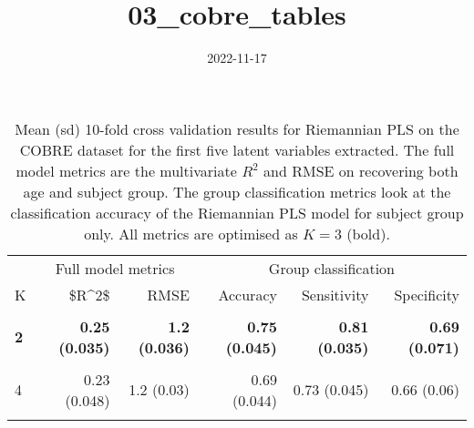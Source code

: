 \documentclass[
]{article}
\title{03\_cobre\_tables}
\author{}
\date{\vspace{-2.5em}2022-11-17}
\begin{document}
\maketitle

\begin{table}[htbp]

\caption{\label{tab:cobre_cv_results}Mean (sd) 10-fold cross validation results for Riemannian PLS on the COBRE dataset for the first five latent variables extracted.  The full model metrics are the multivariate $R^2$ and RMSE on recovering both age and subject group.  The group classification metrics look at the classification accuracy of the Riemannian PLS model for subject group only.  All metrics are optimised as $K = 3$ (bold).}
\centering
\begin{tabular}[t]{lr>{}r|rrr}
\toprule
\multicolumn{1}{c}{ } & \multicolumn{2}{c}{Full model metrics} & \multicolumn{3}{c}{Group classification} \\
\cmidrule(l{3pt}r{3pt}){2-3} \cmidrule(l{3pt}r{3pt}){4-6}
K & \$R\textasciicircum{}2\$ & RMSE & Accuracy & Sensitivity & Specificity\\
\midrule
\cellcolor{gray!6}{1} & \cellcolor{gray!6}{0.15 (0.038)} & \cellcolor{gray!6}{1.27 (0.03)} & \cellcolor{gray!6}{0.62 (0.055)} & \cellcolor{gray!6}{0.68 (0.061)} & \cellcolor{gray!6}{0.56 (0.069)}\\
\textbf{2} & \textbf{0.25 (0.035)} & \textbf{1.2 (0.036)} & \textbf{0.75 (0.045)} & \textbf{0.81 (0.035)} & \textbf{0.69 (0.071)}\\
\cellcolor{gray!6}{3} & \cellcolor{gray!6}{0.27 (0.038)} & \cellcolor{gray!6}{1.18 (0.031)} & \cellcolor{gray!6}{0.75 (0.042)} & \cellcolor{gray!6}{0.81 (0.035)} & \cellcolor{gray!6}{0.69 (0.071)}\\
4 & 0.23 (0.048) & 1.2 (0.03) & 0.69 (0.044) & 0.73 (0.045) & 0.66 (0.06)\\
\cellcolor{gray!6}{5} & \cellcolor{gray!6}{0.22 (0.044)} & \cellcolor{gray!6}{1.21 (0.032)} & \cellcolor{gray!6}{0.69 (0.043)} & \cellcolor{gray!6}{0.73 (0.045)} & \cellcolor{gray!6}{0.64 (0.064)}\\
\bottomrule
\end{tabular}
\end{table}
\end{document}
